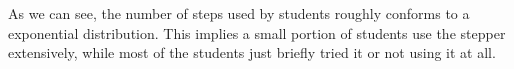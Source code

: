 As we can see, the number of steps used by students roughly conforms
to a exponential distribution. This implies a small portion of
students use the stepper extensively, while most of the students just
briefly tried it or not using it at all.

